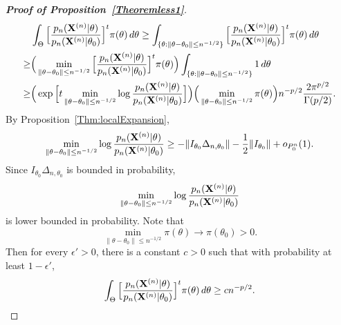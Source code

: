\documentclass[11pt]{article}
\theoremstyle{plain}
\theoremstyle{definition}
\theoremstyle{remark}
\begin{document}
\begin{appendices}
\begin{proof}[\textbf{Proof of Proposition~\ref{Theoremless1}}]
$$\begin{aligned}
        & \int_{\Theta}\Big[\frac{p_n(\mathbf{X}^{(n)}|\theta)}{p_n(\mathbf{X}^{(n)}|\theta_0)}\Big]^{t} \pi(\theta)\, d\theta
        \geq
        \int_{\{\theta:\|\theta-\theta_0\|\leq n^{-1/2}\}}\Big[\frac{p_n(\mathbf{X}^{(n)}|\theta)}{p_n(\mathbf{X}^{(n)}|\theta_0)}\Big]^{t} \pi(\theta)\, d\theta
        \\
        \geq &
        \Big(
        \min_{\|\theta-\theta_0\|\leq n^{-1/2}} 
\Big[\frac{p_n(\mathbf{X}^{(n)}|\theta)}{p_n(\mathbf{X}^{(n)}|\theta_0)}\Big]^{t} \pi(\theta)
        \Big)
        \int_{\{\theta:\|\theta-\theta_0\|\leq n^{-1/2}\}}1\, d\theta\\
        \geq&
        \Big(
        \exp
\Big[
        t\min_{\|\theta-\theta_0\|\leq n^{-1/2}} 
        \log\frac{p_n(\mathbf{X}^{(n)}|\theta)}{p_n(\mathbf{X}^{(n)}|\theta_0)}
        \Big]
        \Big)
        \Big(\min_{\|\theta-\theta_0\|\leq n^{-1/2}} 
        \pi(\theta)
        \Big)
        n^{-p/2}\frac{2\pi^{p/2}}{\Gamma(p/2)}.
    \end{aligned}
    $$
    By Proposition~\ref{Thm:localExpansion},
    $$
   \begin{aligned} 
        \min_{\|\theta-\theta_0\|\leq n^{-1/2}} 
        \log\frac{p_n(\mathbf{X}^{(n)}|\theta)}{p_n(\mathbf{X}^{(n)}|\theta_0)}
        \geq
        -\|I_{\theta_0}\Delta_{n,\theta_0}\|-\frac{1}{2}\|I_{\theta_0}\|+
        o_{P^n_0}(1).
   \end{aligned}
    $$
    Since 
    $I_{\theta_0}\Delta_{n,\theta_0}$
    is bounded in probability, 
    $$\min_{\|\theta-\theta_0\|\leq n^{-1/2}} 
        \log\frac{p_n(\mathbf{X}^{(n)}|\theta)}{p_n(\mathbf{X}^{(n)}|\theta_0)}
    $$ is lower bounded in probability.
    Note that 
    $$\min_{\|\theta-\theta_0\|\leq n^{-1/2}} \pi(\theta)\to \pi(\theta_0)>0.$$
    Then for every $\epsilon'>0$, there is a constant $c>0$ such that with probability at least $1-\epsilon'$,
    $$
         \int_{\Theta}\Big[\frac{p_n(\mathbf{X}^{(n)}|\theta)}{p_n(\mathbf{X}^{(n)}|\theta_0)}\Big]^{t} \pi(\theta)\, d\theta\geq c n^{-p/2}.
    $$







\end{proof}
\end{appendices}
\end{document}
